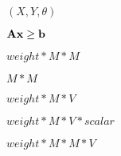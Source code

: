 \documentclass{article}
\begin{document}
$ (X,Y,\theta) $
\pagebreak

${\bf A}{\bf x} \geq {\bf b}$
\pagebreak

$ weight*M*M $
\pagebreak

$ M*M $
\pagebreak

$ weight*M*V $
\pagebreak

$ weight*M*V*scalar $
\pagebreak

$ weight*M*M*V $
\pagebreak
\end{document}
